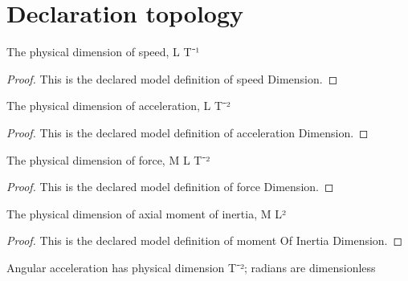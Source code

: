 \section{Declaration topology}
\begin{definition}
  \label{def:physics:phyx-mini-0771:phyxminiproblems-problemphyxmini0771-speeddimension}
  The physical dimension of speed, L T⁻¹
\end{definition}
\begin{proof}
  This is the declared model definition of speed Dimension.
\end{proof}
\begin{definition}
  \label{def:physics:phyx-mini-0771:phyxminiproblems-problemphyxmini0771-accelerationdimension}
  The physical dimension of acceleration, L T⁻²
\end{definition}
\begin{proof}
  This is the declared model definition of acceleration Dimension.
\end{proof}
\begin{definition}
  \label{def:physics:phyx-mini-0771:phyxminiproblems-problemphyxmini0771-forcedimension}
  The physical dimension of force, M L T⁻²
\end{definition}
\begin{proof}
  This is the declared model definition of force Dimension.
\end{proof}
\begin{definition}
  \label{def:physics:phyx-mini-0771:phyxminiproblems-problemphyxmini0771-momentofinertiadimension}
  The physical dimension of axial moment of inertia, M L²
\end{definition}
\begin{proof}
  This is the declared model definition of moment Of Inertia Dimension.
\end{proof}
\begin{definition}
  \label{def:physics:phyx-mini-0771:phyxminiproblems-problemphyxmini0771-angularaccelerationdimension}
  Angular acceleration has physical dimension T⁻²; radians are dimensionless
\end{definition}
